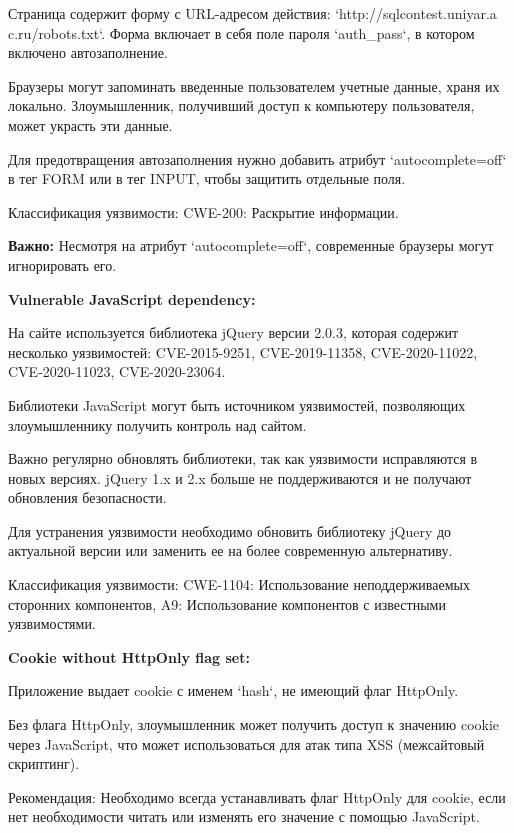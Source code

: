 \documentclass[a4paper,12pt]{diplom}
\begin{document}
	 Страница содержит форму с URL-адресом действия: `http://sqlcontest.uniyar.a c.ru/robots.txt`. Форма включает в себя поле пароля `auth\_pass`,  в котором включено автозаполнение.
	 
	 Браузеры могут запоминать введенные пользователем учетные данные, храня их локально.  Злоумышленник, получивший доступ к компьютеру пользователя, может украсть эти данные.  
	 
	 Для предотвращения автозаполнения нужно добавить атрибут `autocomplete=off` в тег FORM или в тег INPUT, чтобы защитить отдельные поля.  
	 
	 Классификация уязвимости: CWE-200: Раскрытие информации.  
	 
	 \textbf{Важно:} Несмотря на атрибут `autocomplete=off`, современные браузеры могут игнорировать его.
	 
	 
	 \medskip\medskip
	 
	 
	 \textbf{Vulnerable JavaScript dependency:}
	 
	 На сайте используется библиотека jQuery версии 2.0.3, которая содержит несколько уязвимостей:  CVE-2015-9251, CVE-2019-11358, CVE-2020-11022, CVE-2020-11023, CVE-2020-23064.  
	 
	 Библиотеки JavaScript могут быть источником уязвимостей, позволяющих злоумышленнику получить контроль над сайтом. 
	 
	 Важно регулярно обновлять библиотеки, так как уязвимости исправляются в новых версиях. jQuery 1.x и 2.x  больше не поддерживаются и не получают обновления безопасности. 
	 
	 Для устранения уязвимости необходимо обновить библиотеку jQuery до актуальной версии или заменить ее на более современную альтернативу. 
	 
	 Классификация уязвимости:  CWE-1104: Использование неподдерживаемых сторонних компонентов,  A9: Использование компонентов с известными уязвимостями.
	 
	 
	 \medskip\medskip
	 
	 
	 \textbf{Cookie without HttpOnly flag set:}
	 
	 Приложение выдает cookie с именем `hash`, не имеющий флаг HttpOnly.  
	 
	 Без флага HttpOnly, злоумышленник может получить доступ к значению cookie через JavaScript, что может использоваться для атак типа XSS (межсайтовый скриптинг).
	 
	 Рекомендация: Необходимо всегда устанавливать флаг HttpOnly для cookie, если нет необходимости читать или изменять его значение с помощью JavaScript. 
	 
\end{document}

